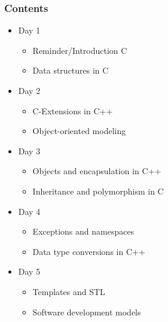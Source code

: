 \documentclass{slides}
\begin{document}
\begin{frame}
  \frametitle{Contents}
  \begin{itemize}
  \item Day 1
    \begin{itemize}
    \item Reminder/Introduction C
    \item Data structures in C
    \end{itemize}
  \item Day 2
    \begin{itemize}
    \item C-Extensions in C++
    \item Object-oriented modeling
    \end{itemize}
  \item Day 3
    \begin{itemize}
    \item Objects and encapsulation in C++
    \item Inheritance and polymorphism in C
    \end{itemize}
    \item Day 4
      \begin{itemize}
      \item Exceptions and namespaces
      \item Data type conversions in C++
      \end{itemize}
    \item Day 5
      \begin{itemize}
      \item Templates and STL
      \item Software development models
      \end{itemize}
  \end{itemize}
\end{frame}
\end{document}
